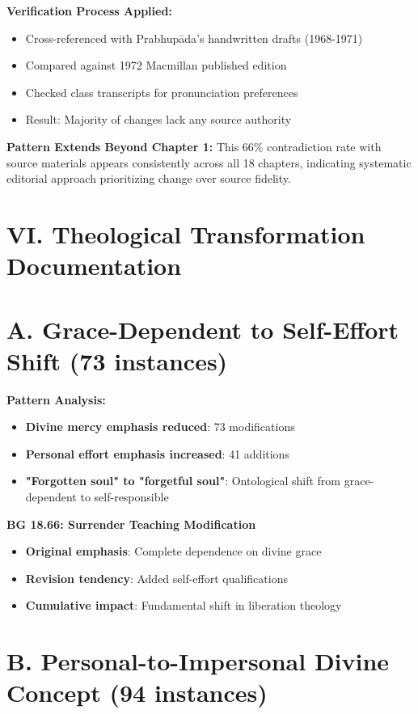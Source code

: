 \documentclass[11pt,twoside]{book}
\begin{document}
\textbf{\textbf{Verification Process Applied:}}
\begin{itemize}
\item Cross-referenced with Prabhupāda's handwritten drafts (1968-1971)
\item Compared against 1972 Macmillan published edition
\item Checked class transcripts for pronunciation preferences
\item Result: Majority of changes lack any source authority
\end{itemize}

\textbf{\textbf{Pattern Extends Beyond Chapter 1:}}
This 66\% contradiction rate with source materials appears consistently across all 18 chapters, indicating systematic editorial approach prioritizing change over source fidelity.
\section*{VI. Theological Transformation Documentation}
\label{sec:org5e93230}

\section*{A. Grace-Dependent to Self-Effort Shift (73 instances)}
\label{sec:orgdf95887}

\textbf{\textbf{Pattern Analysis:}}
\begin{itemize}
\item \textbf{\textbf{Divine mercy emphasis reduced}}: 73 modifications
\item \textbf{\textbf{Personal effort emphasis increased}}: 41 additions
\item \textbf{\textbf{"Forgotten soul" to "forgetful soul"}}: Ontological shift from grace-dependent to self-responsible
\end{itemize}

\textbf{\textbf{BG 18.66: Surrender Teaching Modification}}
\begin{itemize}
\item \textbf{\textbf{Original emphasis}}: Complete dependence on divine grace
\item \textbf{\textbf{Revision tendency}}: Added self-effort qualifications
\item \textbf{\textbf{Cumulative impact}}: Fundamental shift in liberation theology
\end{itemize}
\section*{B. Personal-to-Impersonal Divine Concept (94 instances)}
\label{sec:orgacfa1d1}
\end{document}
